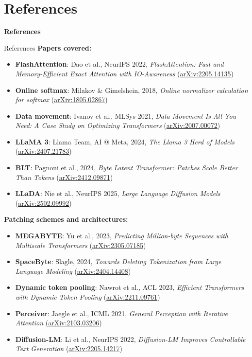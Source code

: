 \section{References}
\begin{frame}{}
    \LARGE \textbf{References}
\end{frame}

\begin{frame}[allowframebreaks]{References}
    \textbf{Papers covered:}
    \begin{itemize}
        \item \textbf{FlashAttention}: Dao et al., NeurIPS 2022, \emph{FlashAttention: Fast and Memory-Efficient Exact Attention with IO-Awareness} (\href{https://arxiv.org/abs/2205.14135}{arXiv:2205.14135})
        \item \textbf{Online softmax}: Milakov \& Gimelshein, 2018, \emph{Online normalizer calculation for softmax} (\href{https://arxiv.org/abs/1805.02867}{arXiv:1805.02867})
        \item \textbf{Data movement}: Ivanov et al., MLSys 2021, \emph{Data Movement Is All You Need: A Case Study on Optimizing Transformers} (\href{https://arxiv.org/abs/2007.00072}{arXiv:2007.00072})
        \item \textbf{LLaMA 3}: Llama Team, AI @ Meta, 2024, \emph{The Llama 3 Herd of Models} (\href{https://arxiv.org/abs/2407.21783}{arXiv:2407.21783})
        \item \textbf{BLT}: Pagnoni et al., 2024, \emph{Byte Latent Transformer: Patches Scale Better Than Tokens} (\href{https://arxiv.org/abs/2412.09871}{arXiv:2412.09871})
        \item \textbf{LLaDA}: Nie et al., NeurIPS 2025, \emph{Large Language Diffusion Models} (\href{https://arxiv.org/abs/2502.09992}{arXiv:2502.09992})
    \end{itemize}
\framebreak
    \textbf{Patching schemes and architectures:}
    \begin{itemize}
        \item \textbf{MEGABYTE}: Yu et al., 2023, \emph{Predicting Million-byte Sequences with Multiscale Transformers} (\href{https://arxiv.org/abs/2305.07185}{arXiv:2305.07185})
        \item \textbf{SpaceByte}: Slagle, 2024, \emph{Towards Deleting Tokenization from Large Language Modeling} (\href{https://arxiv.org/abs/2404.14408}{arXiv:2404.14408})
        \item \textbf{Dynamic token pooling}: Nawrot et al., ACL 2023, \emph{Efficient Transformers with Dynamic Token Pooling} (\href{https://arxiv.org/abs/2211.09761}{arXiv:2211.09761})
        \item \textbf{Perceiver}: Jaegle et al., ICML 2021, \emph{General Perception with Iterative Attention} (\href{https://arxiv.org/abs/2103.03206}{arXiv:2103.03206})
        \item \textbf{Diffusion-LM}: Li et al., NeurIPS 2022, \emph{Diffusion-LM Improves Controllable Text Generation} (\href{https://arxiv.org/abs/2205.14217}{arXiv:2205.14217})
    \end{itemize}


\end{frame}
